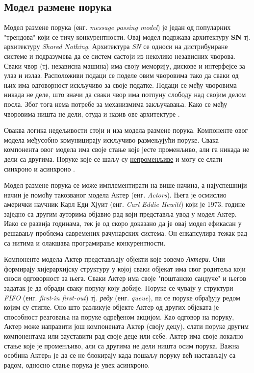 \documentclass[12pt,oneside]{memoir}
\begin{document}
\subsection{Модел размене порука}

Модел размене порука (енг. \textit{message passing model}) је један од популарних "трендова" који се тичу конкурентности. Овај модел подржава архитектуру \textbf{SN} тј. архитектуру \textit{Shared Nothing}. Архитектура \textit{SN} се односи на дистрибуиране системе и подразумева да се систем састоји из неколико независних чворова. Сваки чвор (тј. независна машина) има своју меморију, дискове и интерфејсе за улаз и излаз. Расположиви подаци се поделе овим чворовима тако да сваки од њих има одговорност искључиво за своје податке. Подаци се међу чворовима никада не деле, што значи да сваки чвор има потпуну слободу над својим делом посла. Због тога нема потребе за механизмима закључавања. Како се међу чворовима ништа не дели, отуда и назив ове архитектуре \cite{SNvsSD, warehouse}.

Оваква логика недељивости стоји и иза модела размене порука. Компоненте овог модела међусобно комуницирају искључиво размењујући поруке. Свака компонента овог модела има своје стање које јесте променљиво, али га никада не дели са другима. Поруке које се шаљу су \underline{непроменљиве} и могу се слати синхроно и асинхроно \cite{progInScala}.

Модел размене порука се може имплементирати на више начина, а најуспешнији начин је помоћу такозваног модела Актер (енг. \textit{Actors}). Њега је осмислио амерички научник Карл Еди Хјуит (енг. \textit{Carl Eddie Hewitt}) који је 1973. године заједно са другим ауторима објавио рад који представља увод у модел Актер. Иако се развија годинама, тек је од скоро доказано да је овај модел ефикасан у решавању проблема савремених рачунарских система. Он енкапсулира тежак рад са нитима и олакшава програмирање конкурентности. 

Компоненте модела Актер представљају објекти које зовемо \textit{Актери}. Они формирају хијерархијску структуру у којој сваки објекат има свог родитеља који сноси одговорност за њега. Сваки Актер има своје "поштанско сандуче" и његов задатак је да обради сваку поруку коју добије. Поруке се чувају у структури \textit{FIFO} (енг. \textit{first-in first-out}) тј. \textit{реду} (енг. \textit{queue}), па се поруке обрађују редом којим су стигле. Оно што разликује објекте Актер од других објеката је способност реаговања на поруке одређеном акцијом. Као одговор на поруку, Актер може направити још компонената Актер (своју децу), слати поруке другим компонентама или зауставити рад своје деце или себе. Актер има своје локално стање које је променљиво, али са другима не дели ништа осим порука. Важна особина Актерa је да се не блокирају када пошаљу поруку већ настављају са радом, односно слање порука је увек асинхроно. 
\end{document}
